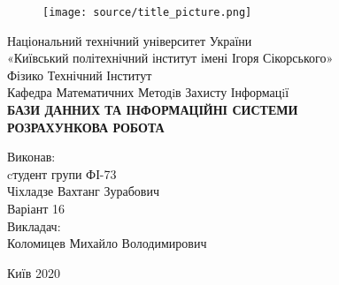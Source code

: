 \begin{titlepage}
\begin{center}
	\begin{figure}[ht]
		\centering
		\texttt{[image: source/title\_picture.png]}	
	\end{figure}
	\vspace{0.25cm}
	\normalsize{Національний технічний університет України}\\ 
	\normalsize{«Київський політехнічний інститут імені Ігоря Сікорського»}\\
	\vspace{1cm}
	\normalsize{Фізико Технічний Інститут}\\
	\normalsize{Кафедра Математичних Методiв Захисту Інформацiї}\\
	\vspace{3.0cm}
	\Large\textbf{БАЗИ ДАННИХ ТА ІНФОРМАЦІЙНІ СИСТЕМИ} \\
	\Large\textbf{РОЗРАХУНКОВА РОБОТА}\\
	\end{center}
	 \vspace{4cm}
	\begin{flushright}
	Виконав:\\
	cтудент групи ФІ-73\\
	Чіхладзе Вахтанг Зурабович\\ 
	Варіант 16\\
	\vspace{0.5cm}
		Викладач:\\
		Коломицев Михайло Володимирович 
	\end{flushright}
	\vspace{\fill} 
	\begin{center} Київ 2020\end{center}
	\thispagestyle{empty}
\end{titlepage}
\newpage